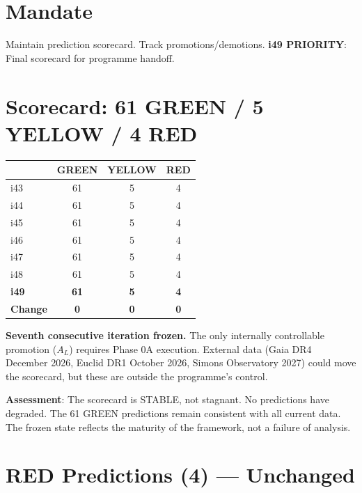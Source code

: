 \documentclass[11pt,a4paper]{article}
\newcommand{\GREEN}{\textcolor{dfdgreen}{\textbf{GREEN}}}
\newcommand{\YELLOW}{\textcolor{dfdyellow}{\textbf{YELLOW}}}
\newcommand{\RED}{\textcolor{dfdred}{\textbf{RED}}}
\begin{document}
\section{Mandate}

Maintain prediction scorecard. Track promotions/demotions. \textbf{i49 PRIORITY}: Final scorecard for programme handoff.

\section{Scorecard: 61 GREEN / 5 YELLOW / 4 RED}

\begin{tcolorbox}[colback=yellow!5!white, colframe=yellow!60!black,
  title={Scorecard: SEVENTH Consecutive Iteration at 61/5/4}]

\begin{center}
\begin{tabular}{lccc}
\toprule
& \textbf{\GREEN} & \textbf{\YELLOW} & \textbf{\RED} \\
\midrule
i43 & 61 & 5 & 4 \\
i44 & 61 & 5 & 4 \\
i45 & 61 & 5 & 4 \\
i46 & 61 & 5 & 4 \\
i47 & 61 & 5 & 4 \\
i48 & 61 & 5 & 4 \\
\textbf{i49} & \textbf{61} & \textbf{5} & \textbf{4} \\
\textbf{Change} & \textbf{0} & \textbf{0} & \textbf{0} \\
\bottomrule
\end{tabular}
\end{center}

\textbf{Seventh consecutive iteration frozen.} The only internally controllable promotion ($A_L$) requires Phase 0A execution. External data (Gaia DR4 December 2026, Euclid DR1 October 2026, Simons Observatory 2027) could move the scorecard, but these are outside the programme's control.

\textbf{Assessment}: The scorecard is STABLE, not stagnant. No predictions have degraded. The 61 GREEN predictions remain consistent with all current data. The frozen state reflects the maturity of the framework, not a failure of analysis.
\end{tcolorbox}

\section{RED Predictions (4) --- Unchanged}
\end{document}
